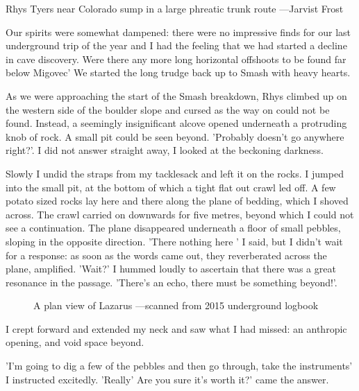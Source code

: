 \begin{marginfigure}
\checkoddpage \ifoddpage \forcerectofloat \else \forceversofloat \fi
\centering
 \caption{Rhys Tyers near Colorado sump in a large phreatic trunk route ---Jarvist Frost}
 \label{near sump}
\end{marginfigure}

Our spirits were somewhat dampened: there were no impressive finds for our last underground trip of the year and I had the feeling that we had started a decline in cave discovery. Were there any more long horizontal offshoots to be found far below Migovec' We started the long trudge back up to Smash with heavy hearts.

As we were approaching the start of the Smash breakdown, Rhys climbed up on the western side of the boulder slope and cursed as the way on could not be found. Instead, a seemingly insignificant alcove opened underneath a protruding knob of rock. A small pit could be seen beyond. 'Probably doesn't go anywhere right?'. I did not answer straight away, I looked at the beckoning darkness.

Slowly I undid the straps from my tacklesack and left it on the rocks. I jumped into the small  pit, at the bottom of which a tight flat out crawl led off. A few potato sized rocks lay here and there along the plane of bedding, which I shoved across. The crawl carried on downwards for five metres, beyond which I could not see a continuation. The plane disappeared underneath a floor of small pebbles, sloping in the opposite direction. 'There nothing here ' I said, but I didn't wait for a response: as soon as the words came out, they reverberated across the plane, amplified. 'Wait?' I hummed loudly to ascertain that there was a great resonance in the passage. 'There's an echo, there must be something beyond!'.


\begin{figure*}[t!]
\checkoddpage \ifoddpage \forcerectofloat \else \forceversofloat \fi
\centering
 \caption{A plan view of Lazarus ---scanned from 2015 underground logbook}
 \label{lazarus plan}
\end{figure*}
I crept forward and extended my neck and saw what I had missed: an anthropic opening, and void space beyond. 

'I'm going to dig a few of the pebbles and then go through, take the instruments' I instructed excitedly. 
'Really' Are you sure it's worth it?' came the answer. 

